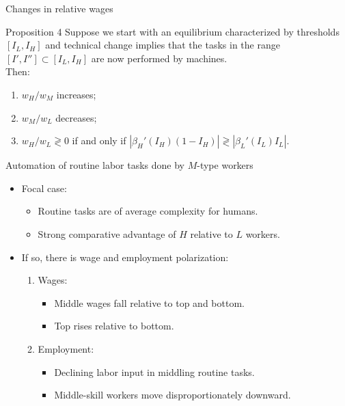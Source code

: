 \documentclass[notes=show]{beamer}
\begin{document}
\begin{frame}{Changes in relative wages}
\begin{block}{Proposition 4}
Suppose we start with an equilibrium characterized by thresholds $[I_{L},I_{H}]$ and technical change implies that the tasks in the range $[I',I''] \subset [I_{L},I_{H}]$ are now performed by machines. \\ \medskip
Then:
\begin{enumerate}
\item $w_{H}/w_{M}$ increases; \medskip
\item $w_{M}/w_{L}$ decreases; \medskip
\item $w_{H}/w_{L} \gtrless 0 $ if and only if $ | \beta_{H}'(I_{H}) (1 - I_{H})| \gtrless |\beta_{L}'(I_{L}) I_{L}| $.
\end{enumerate}
\end{block}
\end{frame}

\begin{frame}{Automation of routine labor tasks done by $M$-type workers}
\begin{itemize}
\item Focal case: \smallskip
\begin{itemize}
\item Routine tasks are of average complexity for humans. \smallskip
\item Strong comparative advantage of $H$ relative to $L$ workers. \smallskip
\end{itemize}
\item If so, there is wage and employment polarization: \smallskip
\begin{enumerate}
\item Wages: \smallskip
\begin{itemize}
\item Middle wages fall relative to top and bottom. \smallskip
\item Top rises relative to bottom.
\end{itemize}
\item Employment: \smallskip
\begin{itemize}
\item Declining labor input in middling routine tasks. \smallskip
\item Middle-skill workers move disproportionately downward.
\end{itemize}
\end{enumerate}
\end{itemize}
\end{frame}
\end{document}
